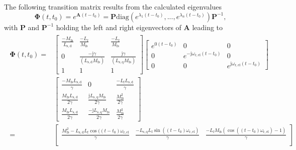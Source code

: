 \begin{solutionblock}
    The following transition matrix results from the calculated eigenvalues
    \begin{equation}
        \bm{\Phi}(t,t_{\mathrm{0}}) = e^{\bm{A}(t-t_{\mathrm{0}})} = \bm{P} \mathrm{diag}\left(e^{\lambda_{\mathrm{1}}(t-t_{\mathrm{0}})}, ..., e^{\lambda_n(t-t_{\mathrm{0}})}\right)\bm{P}^{-1},
    \end{equation}
    with $\bm{P}$ and $\bm{P}^{-1}$ holding the left and right eigenvectors of $\bm{A}$ leading to
    \begin{align}
        \begin{split}
            \bm{\Phi}(t,t_{\mathrm{0}}) =
        &
        \begin{bmatrix}
            \frac{-M_{\mathrm{fs}}}{L_{\mathrm{s,d}}}     & \frac{-L_{\mathrm{f}}}{M_{\mathrm{fs}}} & \frac{-L_{\mathrm{f}}}{M_{\mathrm{fs}}} \\
            0 & \frac{-\mathrm{j}\gamma }{(L_{\mathrm{s,d}}M_{\mathrm{fs}})} & \frac{\mathrm{j}\gamma }{(L_{\mathrm{s,q}}M_{\mathrm{fs}})} \\
            1 & 1 & 1
        \end{bmatrix}
        \begin{bmatrix}
            e^{0(t-t_{\mathrm{0}})} & 0 & 0 \\
            0 & e^{-\mathrm{j}\omega_{\mathrm{r,el}}(t-t_{\mathrm{0}})} & 0 \\
            0 & 0 & e^{\mathrm{j}\omega_{\mathrm{r,el}}(t-t_{\mathrm{0}})}
        \end{bmatrix}
        \\
        &
        \begin{bmatrix}
            \frac{-M_{\mathrm{fs}}L_{\mathrm{s,d}}}{\gamma} & 0 & \frac{-L_{\mathrm{f}}L_{\mathrm{s,d}}}{\gamma} \\
            \frac{M_{\mathrm{fs}}L_{\mathrm{s,d}}}{2\gamma} & \frac{\mathrm{j}L_{\mathrm{s,q}}M_{\mathrm{fs}}}{2\gamma} & \frac{M_{\mathrm{fs}}^2}{2\gamma} \\
            \frac{M_{\mathrm{fs}}L_{\mathrm{s,d}}}{2\gamma} & \frac{-\mathrm{j}L_{\mathrm{s,q}}M_{\mathrm{fs}}}{2\gamma} & \frac{M_{\mathrm{fs}}^2}{2\gamma}
        \end{bmatrix}
        \\ = &
        \begin{bmatrix}
            \frac{M_{\mathrm{fs}}^2 - L_{\mathrm{s,d}}L_{\mathrm{f}}\cos((t-t_{\mathrm{0}})\omega_{\mathrm{r,el}}}{\gamma} & \frac{-L_{\mathrm{s,q}}L_{\mathrm{f}}\sin((t-t_{\mathrm{0}})\omega_{\mathrm{r,el}})}{\gamma} & \frac{-L_{\mathrm{f}}M_{\mathrm{fs}}(\cos((t-t_{\mathrm{0}})\omega_{\mathrm{r,el}})-1)}{\gamma} \\

\end{bmatrix}
\end{split}
\end{align}
\end{solutionblock}
